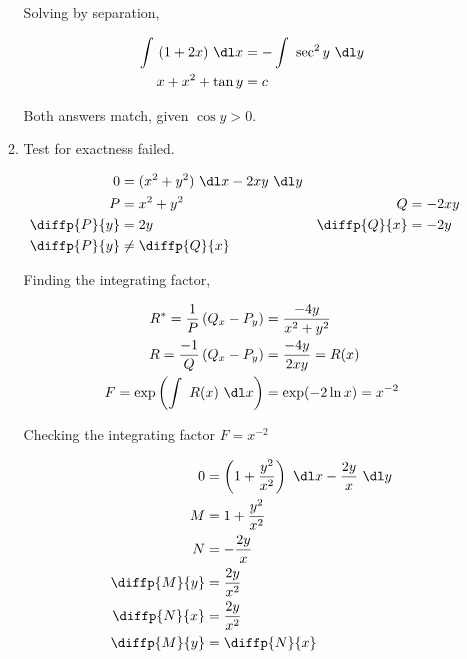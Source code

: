 \begin{enumerate}
\begin{enumerate}
                    Solving by separation,

                    \begin{align}
                        \int\ (1+2x)\ \dl x & = -\int\ \sec^{2}y\ \dl y \\
                        x + x^{2} + \tan y  & =  c
                    \end{align}

                    Both answers match, given $ \cos y > 0 $.

              \item Test for exactness failed.

                    \begin{align}
                        0            & = (x^{2} + y^{2})\ \dl x - 2xy\ \dl y                         \\
                        P            & = x^{2} + y^{2}                       & Q            & = -2xy \\
                        \diffp{P}{y} & = 2y                                  & \diffp{Q}{x} & = -2y  \\
                        \diffp{P}{y} & \neq \diffp{Q}{x}
                    \end{align}

                    Finding the integrating factor,

                    \begin{align}
                        R^{*} = \frac{1}{P} \left( Q_{x} - P_{y} \right) & = \frac{-4y}{x^{2} + y^{2}} \\
                        R = \frac{-1}{Q}\left( Q_{x} - P_{y} \right)     & = \frac{-4y}{2xy} = R(x)    \\
                        F = \exp \left( \int\ R(x)\ \dl x \right)        & = \exp (-2\ln x) = x^{-2}
                    \end{align}

                    Checking the integrating factor $ F = x^{-2} $

                    \begin{align}
                        0            & = \left( 1 + \frac{y^{2}}{x^{2}} \right)\ \dl x - \frac{2y}{x}\ \dl y \\
                        M            & = 1 + \frac{y^{2}}{x^{2}}                                             \\
                        N            & = - \frac{2y}{x}                                                      \\
                        \diffp{M}{y} & = \frac{2y}{x^{2}}                                                    \\
                        \diffp{N}{x} & = \frac{2y}{x^{2}}                                                    \\
                        \diffp{M}{y} & = \diffp{N}{x}
                    \end{align}


\end{enumerate}
\end{enumerate}
